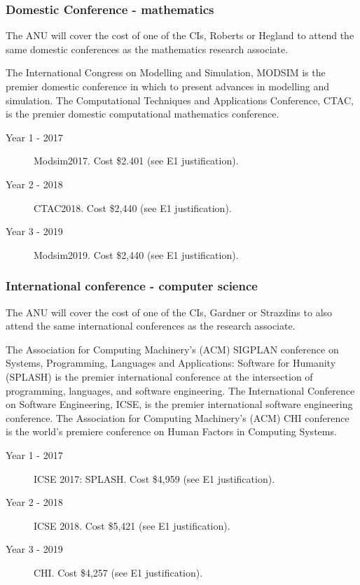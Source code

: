\documentclass[a4paper,fontsize=12pt]{scrartcl}
\begin{document}
\subsubsection*{Domestic Conference - mathematics}

The ANU will cover the cost of one of the CIs, Roberts or Hegland to attend the  same domestic conferences as the mathematics research associate. 

The International Congress on Modelling and Simulation, MODSIM is the premier domestic conference in which to present advances in modelling and simulation. 
The Computational Techniques and Applications Conference, CTAC, is the premier domestic computational mathematics conference.

\begin{description}
\item[Year 1 - 2017] Modsim2017. Cost \$2.401  (see E1 justification).

\item[Year 2 - 2018] CTAC2018. Cost \$2,440  (see E1 justification).

\item[Year 3 - 2019] Modsim2019.  Cost \$2,440  (see E1 justification).


\end{description}

\subsubsection*{International conference - computer science}


The ANU will cover the cost of one of the CIs, Gardner or Strazdins to also attend the same international conferences as the research associate. 

The  Association for Computing Machinery’s (ACM) SIGPLAN conference on Systems, Programming, Languages and Applications: Software for Humanity (SPLASH) is the premier international conference at the intersection of programming, languages, and software engineering.
The International Conference on Software Engineering, ICSE, is the premier international software engineering conference.
The Association for Computing Machinery’s (ACM) CHI conference is the world's premiere conference on Human Factors in Computing Systems.

\begin{description}
\item[Year 1 - 2017] ICSE 2017: SPLASH. Cost \$4,959  (see E1 justification).

\item[Year 2 - 2018] ICSE 2018.  Cost \$5,421  (see E1 justification).

\item[Year 3 - 2019] CHI.  Cost \$4,257  (see E1 justification).

\end{description}
\end{document}
